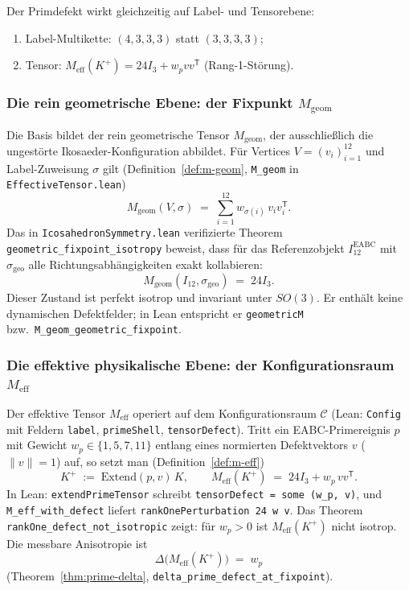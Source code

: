 \documentclass[11pt,a4paper]{article}
\begin{document}
	Der Primdefekt wirkt gleichzeitig auf Label- und Tensorebene:
	\begin{enumerate}
		\item[(L)] Label-Multikette: $(4,3,3,3)$ statt $(3,3,3,3)$;
		\item[(T)] Tensor: $M_{\mathrm{eff}}(K^+)=24I_3+w_pvv^{\mathsf T}$ (Rang-1-Störung).
	\end{enumerate}
	
	\subsubsection{Die rein geometrische Ebene: der Fixpunkt $M_{\mathrm{geom}}$}
	
	Die Basis bildet der rein geometrische Tensor $M_{\mathrm{geom}}$, der ausschließlich
	die ungestörte Ikosaeder-Konfiguration abbildet.
	Für Vertices $V=(v_i)_{i=1}^{12}$ und Label-Zuweisung $\sigma$ gilt
	(Definition~\ref{def:m-geom}, \texttt{M\_geom} in \texttt{EffectiveTensor.lean})
	\[
	M_{\mathrm{geom}}(V,\sigma)
	\;=\;
	\sum_{i=1}^{12} w_{\sigma(i)}\, v_i v_i^{\mathsf T}.
	\]
	Das in \texttt{IcosahedronSymmetry.lean} verifizierte Theorem
	\texttt{geometric\_fixpoint\_isotropy} beweist, dass für das Referenzobjekt
	$I_{12}^{\mathrm{EABC}}$ mit $\sigma_{\mathrm{geo}}$ alle Richtungsabhängigkeiten
	exakt kollabieren:
	\[
	\boxed{
		M_{\mathrm{geom}}(I_{12},\sigma_{\mathrm{geo}}) \;=\; 24I_3
	}.
	\]
	Dieser Zustand ist perfekt isotrop und invariant unter $SO(3)$.
	Er enthält keine dynamischen Defektfelder; in Lean entspricht er
	\texttt{geometricM} bzw.\ \texttt{M\_geom\_geometric\_fixpoint}.
	
	\subsubsection{Die effektive physikalische Ebene: der Konfigurationsraum $M_{\mathrm{eff}}$}
	
	Der effektive Tensor $M_{\mathrm{eff}}$ operiert auf dem Konfigurationsraum
	$\mathcal{C}$ (Lean: \texttt{Config} mit Feldern \texttt{label},
	\texttt{primeShell}, \texttt{tensorDefect}).
	Tritt ein EABC-Primereignis $p$ mit Gewicht $w_p\in\{1,5,7,11\}$ entlang eines
	normierten Defektvektors $v$ ($\|v\|=1$) auf, so setzt man
	(Definition~\ref{def:m-eff})
	\[
	K^+ \;:=\; \mathrm{Extend}(p,v)\,K,
	\qquad
	M_{\mathrm{eff}}(K^+) \;=\; 24I_3 + w_p\,vv^{\mathsf T}.
	\]
	In Lean: \texttt{extendPrimeTensor} schreibt \texttt{tensorDefect = some (w\_p, v)},
	und \texttt{M\_eff\_with\_defect} liefert \texttt{rankOnePerturbation 24 w v}.
	Das Theorem \texttt{rankOne\_defect\_not\_isotropic} zeigt: für $w_p>0$ ist
	$M_{\mathrm{eff}}(K^+)$ nicht isotrop.
	Die messbare Anisotropie ist
	\[
	\Delta\bigl(M_{\mathrm{eff}}(K^+)\bigr) \;=\; w_p
	\]
	(Theorem~\ref{thm:prime-delta}, \texttt{delta\_prime\_defect\_at\_fixpoint}).
	
\end{document}
